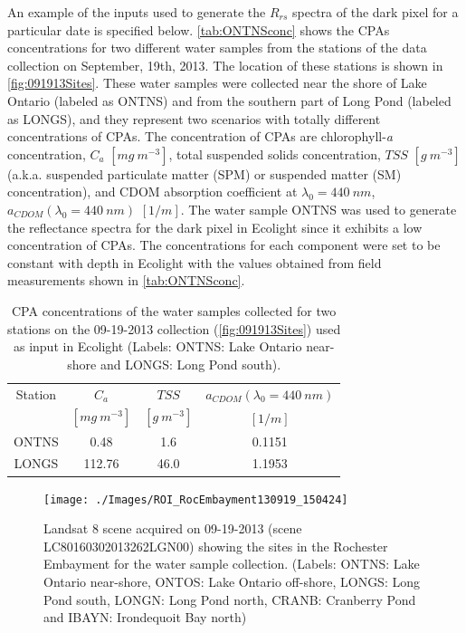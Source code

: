 \documentclass[onecolumn,3p,letterpaper]{elsarticle}
\begin{document}
An example of the inputs used to generate the $R_{rs}$ spectra of the dark pixel for a particular date is specified below. \autoref{tab:ONTNSconc} shows the CPAs concentrations for two different water samples from the stations of the data collection on September, 19th, 2013. The location of these stations is shown in \autoref{fig:091913Sites}. These water samples were collected near the shore of Lake Ontario (labeled as ONTNS) and from the southern part of Long Pond (labeled as LONGS), and they represent two scenarios with totally different concentrations of CPAs. The concentration of CPAs are chlorophyll-{\it a} concentration, $C_a$ $[mg~m^{-3}]$, total suspended solids concentration, $TSS$ $[g~m^{-3}]$ (a.k.a. suspended particulate matter (SPM) or suspended matter (SM) concentration), and CDOM absorption coefficient at $\lambda_0=440~nm$, $a_{CDOM}(\lambda_0=440~nm)$ $[1/m]$. The water sample ONTNS was used to generate the reflectance spectra for the dark pixel in Ecolight since it exhibits a low concentration of CPAs. The concentrations for each component were set to be constant with depth in Ecolight with the values obtained from field measurements shown in \autoref{tab:ONTNSconc}.

\begin{table}[htbp!]
\caption{ CPA concentrations of the water samples collected for two stations on the 09-19-2013 collection (\autoref{fig:091913Sites}) used as input in Ecolight (Labels: ONTNS: Lake Ontario near-shore and LONGS: Long Pond south). \label{tab:ONTNSconc} } 
\small
\centering
\begin{tabular}{c|c|c|c} 
 Station & \bfseries{$C_a$} & \bfseries{$TSS$} & \bfseries{$a_{CDOM}(\lambda_0=440~nm)$}\\
 & $[mg~m^{-3}]$ & $[g~m^{-3}]$ & $[1/m]$ \\ \hline \hline
ONTNS & 0.48   & 1.6  & 0.1151 \\ 
LONGS & 112.76 & 46.0 & 1.1953 \\ 
 \end{tabular}
\end{table}

\begin{figure}[htb]
  \centering
  \texttt{[image: ./Images/ROI\_RocEmbayment130919\_150424]}
  \caption{Landsat 8 scene acquired on 09-19-2013 (scene LC80160302013262LGN00) showing the sites in the Rochester Embayment for the water sample collection. (Labels: ONTNS: Lake Ontario near-shore, ONTOS: Lake Ontario off-shore, LONGS: Long Pond south, LONGN: Long Pond north, CRANB: Cranberry Pond and IBAYN: Irondequoit Bay north)\label{fig:091913Sites} } 
\end{figure}
\end{document}
